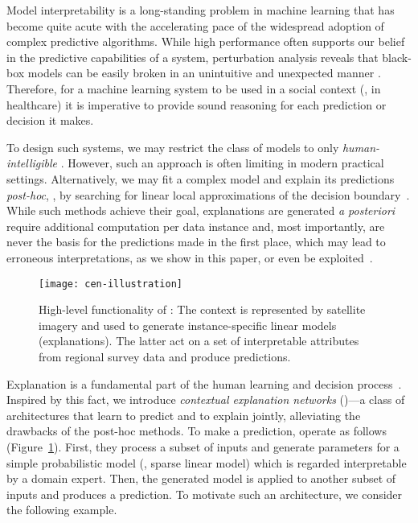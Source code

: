 \documentclass[twoside,11pt]{article}
\begin{document}
Model interpretability is a long-standing problem in machine learning that has become quite acute with the accelerating pace of the widespread adoption of complex predictive algorithms.
While high performance often supports our belief in the predictive capabilities of a system, perturbation analysis reveals that black-box models can be easily broken in an unintuitive and unexpected manner \citep{szegedy2013intriguing,nguyen2015deep}.
Therefore, for a machine learning system to be used in a social context (\eg, in healthcare) it is imperative to provide sound reasoning for each prediction or decision it makes.

To design such systems, we may restrict the class of models to only \emph{human-intelligible} \citep{caruana2015intelligible}.
However, such an approach is often limiting in modern practical settings.
Alternatively, we may fit a complex model and explain its predictions \emph{post-hoc}, \eg, by searching for linear local approximations of the decision boundary~\citep{ribeiro2016trust}.
While such methods achieve their goal, explanations are generated \emph{a posteriori} require additional computation per data instance and, most importantly, are never the basis for the predictions made in the first place, which may lead to erroneous interpretations, as we show in this paper, or even be exploited~\citep{dombrowski2019explanations, lakkaraju2019fool}.


\begin{figure}[t]
    \centering
    \texttt{[image: cen-illustration]}\caption{High-level functionality of {\CENs}:
        The context is represented by satellite imagery and used to generate instance-specific linear models (explanations).
        The latter act on a set of interpretable attributes from regional survey data and produce predictions.}
    \label{fig:illustration}
\end{figure}
 
Explanation is a fundamental part of the human learning and decision process~\citep{lombrozo2006structure}.
Inspired by this fact, we introduce \emph{contextual explanation networks} ({\CENs})---a class of architectures that learn to predict and to explain jointly, alleviating the drawbacks of the post-hoc methods.
To make a prediction, {\CENs} operate as follows (Figure~\ref{fig:illustration}).
First, they process a subset of inputs and generate parameters for a simple probabilistic model (\eg, sparse linear model) which is regarded interpretable by a domain expert.
Then, the generated model is applied to another subset of inputs and produces a prediction.
To motivate such an architecture, we consider the following example.
\end{document}

